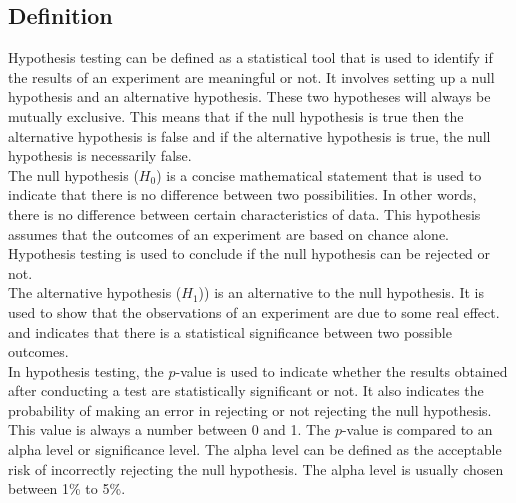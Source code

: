 \documentclass[a4paper]{article}
\begin{document}
	\subsection{Definition}
	Hypothesis testing can be defined as a statistical tool that is used to identify if the results of an experiment are meaningful or not. It involves setting up a null hypothesis and an alternative hypothesis. These two hypotheses will always be mutually exclusive. This means that if the null hypothesis is true then the alternative hypothesis is false and if the alternative hypothesis is true, the null hypothesis is necessarily false.\\
	The null hypothesis ($H_0$) is a concise mathematical statement that is used to indicate that there is no difference between two possibilities. In other words, there is no difference between certain characteristics of data. This hypothesis assumes that the outcomes of an experiment are based on chance alone. Hypothesis testing is used to conclude if the null hypothesis can be rejected or not.\\
	The alternative hypothesis ($H_1$)) is an alternative to the null hypothesis. It is used to show that the observations of an experiment are due to some real effect. and indicates that there is a statistical significance between two possible outcomes.\\
	In hypothesis testing, the $p$-value is used to indicate whether the results obtained after conducting a test are statistically significant or not. It also indicates the probability of making an error in rejecting or not rejecting the null hypothesis. This value is always a number between 0 and 1. The $p$-value is compared to an alpha level or significance level. The alpha level can be defined as the acceptable risk of incorrectly rejecting the null hypothesis. The alpha level is usually chosen between 1\% to 5\%.
\end{document}
